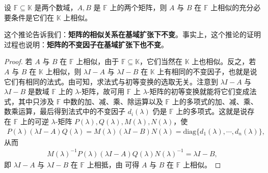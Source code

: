\documentclass[../../main.tex]{subfiles}
\begin{document}
\begin{corollary}
设 $\mathbb{F}\subseteq\mathbb{K}$ 是两个数域，$A, B$ 是 $\mathbb{F}$ 上的两个矩阵，则 $A$ 与 $B$ 在 $\mathbb{F}$ 上相似的充分必要条件是它们在 $\mathbb{K}$ 上相似。
\end{corollary}
\begin{note}
这个推论告诉我们：\textbf{矩阵的相似关系在基域扩张下不变}。事实上，这个推论的证明过程也说明：\textbf{矩阵的不变因子在基域扩张下也不变}。 
\end{note}
\begin{proof}
若 $A$ 与 $B$ 在 $\mathbb{F}$ 上相似，由于 $\mathbb{F}\subseteq\mathbb{K}$，它们当然在 $\mathbb{K}$ 上也相似。反之，若 $A$ 与 $B$ 在 $\mathbb{K}$ 上相似，则 $\lambda I - A$ 与 $\lambda I - B$ 在 $\mathbb{K}$ 上有相同的不变因子，也就是说它们有相同的法式。由可知，求法式与初等变换的选取无关。注意到 $\lambda I - A$ 与 $\lambda I - B$ 是数域 $\mathbb{F}$ 上的 $\lambda$-矩阵，故可用 $\mathbb{F}$ 上 $\lambda$-矩阵的初等变换就能将它们变成法式，其中只涉及 $\mathbb{F}$ 中数的加、减、乘、除运算以及 $\mathbb{F}$ 上的多项式的加、减、乘、数乘运算，最后得到法式中的不变因子 $d_i(\lambda)$ 仍是 $\mathbb{F}$ 上的多项式。这就是说存在 $\mathbb{F}$ 上的可逆 $\lambda$-矩阵 $P(\lambda), Q(\lambda), M(\lambda), N(\lambda)$，使
\begin{align*}
P(\lambda)(\lambda I - A)Q(\lambda)=M(\lambda)(\lambda I - B)N(\lambda)=\mathrm{diag}\{d_1(\lambda),\cdots,d_n(\lambda)\},
\end{align*}
从而
\begin{align*}
M(\lambda)^{-1}P(\lambda)(\lambda I - A)Q(\lambda)N(\lambda)^{-1}=\lambda I - B,
\end{align*}
即 $\lambda I - A$ 与 $\lambda I - B$ 在 $\mathbb{F}$ 上相抵，由 可得 $A$ 与 $B$ 在 $\mathbb{F}$ 上相似。
\end{proof}
\end{document}
